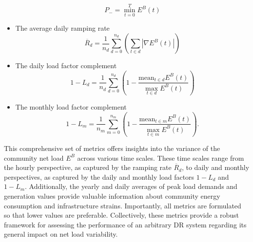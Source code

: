 \documentclass[preprint, 12pt]{elsarticle}
\begin{document}
\begin{itemize}
        \begin{equation}
            \label{eq:MaxValley_Alex3}
            P_{-} = \min_{t=0}^{T} E^B(t)
        \end{equation}
    \item The average daily ramping rate
        \begin{equation}
        \label{eq:AvgDailyRampRate_Alex3}
            \overline{R}_{d} = \frac{1}{n_d} \sum_{d=0}^{n_d} \left( \sum_{t \in d} |\nabla E^B(t)| \right)
        \end{equation}
    \item The daily load factor complement
        \begin{equation}
        \label{eq:DailyLoadFactor_Alex3}
        1- L_{d} = \frac{1}{n_d} \sum_{d=0}^{n_d} \left( 
                            1 - \frac
                                {\mathrm{mean}_{t \in d} E^B(t)}
                                {\max_{t \in d} E^B(t)}
                        \right)
        \end{equation}
    \item The monthly load factor complement
       \begin{equation}
        \label{eq:MonthlyLoadFactor_Alex3}
        1- L_{m} =  \frac{1}{n_m} \sum_{m=0}^{n_m} \left( 
                            1 - \frac
                                {\mathrm{mean}_{t \in m} E^B(t)}
                                {\max_{t \in m} E^B(t)}
                        \right).
        \end{equation}
\end{itemize}

This comprehensive set of metrics offers insights into the variance of the community net load $E^{B}$ across various time scales. These time scales range from the hourly perspective, as captured by the ramping rate $\overline{R}_{d}$, to daily and monthly perspectives, as captured by the daily and monthly load factors $1- L_{d}$ and $1- L_{m}$. Additionally, the yearly and daily averages of peak load demands and generation values provide valuable information about community energy consumption and infrastructure strains. Importantly, all metrics are formulated so that lower values are preferable. Collectively, these metrics provide a robust framework for assessing the performance of an arbitrary DR system regarding its general impact on net load variability.
\end{document}
